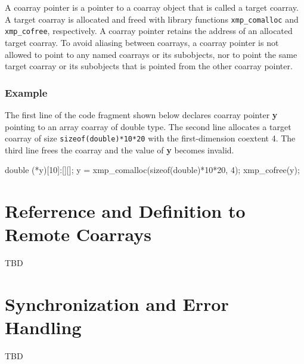 A coarray pointer is a pointer to a coarray object that is
called a target coarray.
A target coarray is allocated and freed with library functions
{\tt xmp\_comalloc} and {\tt xmp\_cofree}, respectively.
A coarray pointer retains the address of an allocated target coarray.
To avoid aliasing between coarrays, a coarray pointer is not allowed to 
point to any named coarrays or its subobjects,
nor to point the same target coarray or its subobjects that is pointed from
the other coarray pointer.


\subsubsection*{Example}

The first line of the code fragment shown below 
declares coarray pointer {\bf y} pointing to an array coarray 
of double type. 
The second line allocates a target coarray of size 
{\tt sizeof(double)*10*20} with the first-dimension coextent 4.
The third line frees the coarray and the value of {\bf y} becomes
invalid.

\begin{center}
 \begin{minipage}{0.70\hsize}
  \begin{XCexampleR}
  double (*y)[10]:[][];
  y = xmp_comalloc(sizeof(double)*10*20, 4);
  xmp_cofree(y);
  \end{XCexampleR}
 \end{minipage}
\end{center}


\section{Referrence and Definition to Remote Coarrays}
\label{sec:Referrence and Definition to Remote Coarrays}

TBD
%

\section{Synchronization and Error Handling}
\label{sec:Synchronization and Error Handling}

TBD

